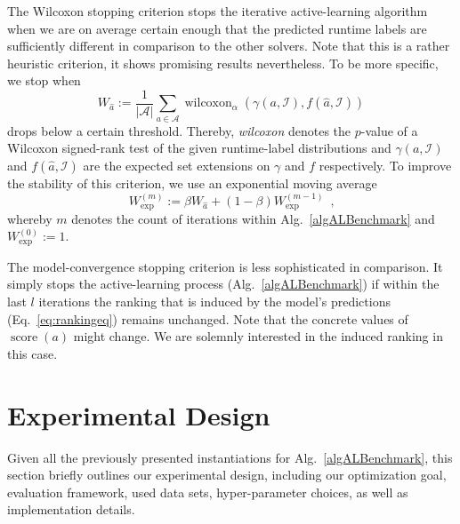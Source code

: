 \documentclass[runningheads]{llncs}
\begin{document}
The Wilcoxon stopping criterion stops the iterative active-learning algorithm when we are on average certain enough that the predicted runtime labels are sufficiently different in comparison to the other solvers.
Note that this is a rather heuristic criterion, it shows promising results nevertheless.
To be more specific, we stop when
\begin{equation}
  W_{\hat{a}} := \frac{1}{\left\lvert \mathcal{A} \right\rvert} \sum_{a \in \mathcal{A}} \operatorname{wilcoxon}_{\alpha}\!\left(\gamma\!\left(a, \mathcal{I}\right), f\!\left(\hat{a}, \mathcal{I}\right) \right)
\end{equation}
drops below a certain threshold.
Thereby, \textit{wilcoxon} denotes the $p$-value of a Wilcoxon signed-rank test of the given runtime-label distributions and $\gamma\!\left(a, \mathcal{I}\right)$ and $f\!\left(\hat{a}, \mathcal{I}\right)$ are the expected set extensions on $\gamma$ and $f$ respectively.
To improve the stability of this criterion, we use an exponential moving average
\begin{equation}
  W_{\exp}^{\left(m\right)} := \beta W_{\hat{a}} + \left(1 - \beta\right) W_{\exp}^{\left(m - 1\right)} \enspace \textrm{,}
\end{equation}
whereby $m$ denotes the count of iterations within Alg.~\ref{algALBenchmark} and $W_{\exp}^{\left(0\right)} := 1$.

The model-convergence stopping criterion is less sophisticated in comparison.
It simply stops the active-learning process (Alg.~\ref{algALBenchmark}) if within the last $l$ iterations the ranking that is induced by the model's predictions (Eq.~\ref{eq:rankingeq}) remains unchanged.
Note that the concrete values of $\operatorname{score}\!\left(a\right)$ might change.
We are solemnly interested in the induced ranking in this case.


\section{Experimental Design}
Given all the previously presented instantiations for Alg.~\ref{algALBenchmark}, this section briefly outlines our experimental design, including our optimization goal, evaluation framework, used data sets, hyper-parameter choices, as well as implementation details.
\end{document}
